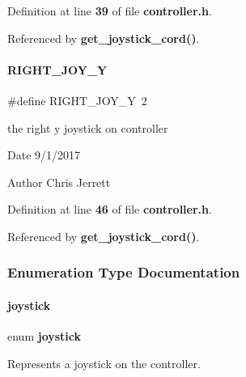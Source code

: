 Definition at line \textbf{ 39} of file \textbf{ controller.\+h}.



Referenced by \textbf{ get\+\_\+joystick\+\_\+cord()}.

\mbox{\label{controller_8h_a99457bf9dee795334411ea77f0858b16}} 
\paragraph{R\+I\+G\+H\+T\+\_\+\+J\+O\+Y\+\_\+Y}
{\footnotesize\ttfamily \#define R\+I\+G\+H\+T\+\_\+\+J\+O\+Y\+\_\+Y~2}



the right y joystick on controller 

\begin{DoxyDate}{Date}
9/1/2017 
\end{DoxyDate}
\begin{DoxyAuthor}{Author}
Chris Jerrett 
\end{DoxyAuthor}


Definition at line \textbf{ 46} of file \textbf{ controller.\+h}.



Referenced by \textbf{ get\+\_\+joystick\+\_\+cord()}.



\subsubsection{Enumeration Type Documentation}
\mbox{\label{controller_8h_ac365c9e892abe4a1b85ae8f56a4eae5a}} 
\paragraph{joystick}
{\footnotesize\ttfamily enum \textbf{ joystick}}



Represents a joystick on the controller. 

